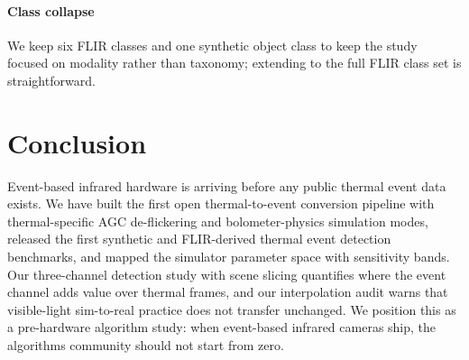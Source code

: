 \paragraph{Class collapse}
We keep six FLIR classes and one synthetic object class to keep the study
focused on modality rather than taxonomy; extending to the full FLIR class
set is straightforward.

\section{Conclusion}
\label{sec:conclusion}

Event-based infrared hardware is arriving before any public thermal event
data exists. We have built the first open thermal-to-event conversion
pipeline with thermal-specific AGC de-flickering and bolometer-physics
simulation modes, released the first synthetic and FLIR-derived thermal
event detection benchmarks, and mapped the simulator parameter space with
sensitivity bands. Our three-channel detection study with scene slicing
quantifies where the event channel adds value over thermal frames, and our
interpolation audit warns that visible-light sim-to-real practice does not
transfer unchanged. We position this as a pre-hardware algorithm study:
when event-based infrared cameras ship, the algorithms community should not
start from zero.
